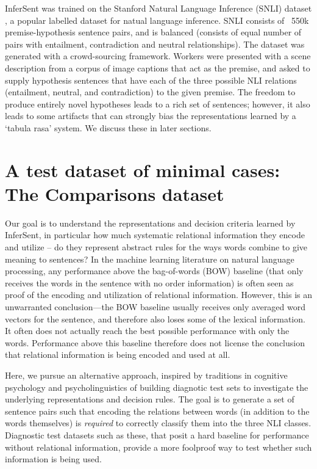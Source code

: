 InferSent was trained on the Stanford Natural Language Inference (SNLI) dataset \citep{snli:emnlp2015}, a popular labelled dataset for natual language inference. SNLI consists of ~550k premise-hypothesis sentence pairs, and is balanced (consists of equal number of pairs with entailment, contradiction and neutral relationships). The dataset was generated with a crowd-sourcing framework. Workers were presented with a scene description from a corpus of image captions that act as the premise, and asked to supply hypothesis sentences that have each of the three possible NLI relations (entailment, neutral, and contradiction) to the given premise. The freedom to produce entirely novel hypotheses leads to a rich set of sentences; however, it also leads to some artifacts that can strongly bias the representations learned by a `tabula rasa' system. We discuss these in later sections.

\section{A test dataset of minimal cases: The Comparisons dataset}
Our goal is to understand the representations and decision criteria learned by InferSent, in particular how much systematic relational information they encode and utilize -- do they represent abstract rules for the ways words combine to give meaning to sentences? In the machine learning literature on natural language processing, any performance above the bag-of-words (BOW) baseline (that only receives the words in the sentence with no order information) is often seen as proof of the encoding and utilization of relational information. However, this is an unwarranted conclusion---the BOW baseline usually receives only averaged word vectors for the sentence, and therefore also loses some of the lexical information. It often does not actually reach the best possible performance with only the words. Performance above this baseline therefore does not license the conclusion that relational information is being encoded and used at all.

Here, we pursue an alternative approach, inspired by traditions in cognitive psychology and psycholinguistics of building diagnotic test sets to investigate the underlying representations and decision rules. The goal is to generate a set of sentence pairs such that encoding the relations between words (in addition to the words themselves) is \textit{required} to correctly classify them into the three NLI classes. Diagnostic test datasets such as these, that posit a hard baseline for performance without relational information, provide a more foolproof way to test whether such information is being used.


